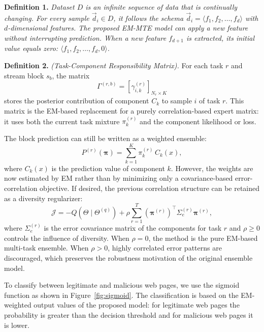 \documentclass[12pt,a4paper]{article}
\begin{document}
	\medskip
	\noindent\textbf{Definition 1.} \textit{Dataset $D$ is an infinite sequence of data that is continually changing. For every sample $\vec{d}_i \in D$, it follows the schema $\vec{d}_i = \langle f_1, f_2, \ldots, f_d \rangle$ with $d$-dimensional features. The proposed EM-MTE model can apply a new feature without interrupting prediction. When a new feature $f_{d+1}$ is extracted, its initial value equals zero: $\langle f_1, f_2, \ldots, f_d, 0 \rangle$.}
	
	\medskip
	\noindent\textbf{Definition 2.} \textit{(Task-Component Responsibility Matrix).} For each task $r$ and stream block $s_b$, the matrix
	\[
	\Gamma^{(r,b)}=
	\left[\gamma_{i,k}^{(r)}\right]_{N_r\times K}
	\]
	stores the posterior contribution of component $C_k$ to sample $i$ of task $r$. This matrix is the EM-based replacement for a purely correlation-based expert matrix: it uses both the current task mixture $\pi_k^{(r)}$ and the component likelihood or loss.
	
	The block prediction can still be written as a weighted ensemble:
	\begin{equation}
		P^{(r)}(\boldsymbol{\pi}) = \sum_{k=1}^{K} \pi_k^{(r)}\, C_k(x),
		\label{eq:pW}
	\end{equation}
	where $C_k(x)$ is the prediction value of component $k$. However, the weights are now estimated by EM rather than by minimizing only a covariance-based error-correlation objective. If desired, the previous correlation structure can be retained as a diversity regularizer:
	\begin{equation}
		\mathcal{J}
		=
		-Q(\Theta\mid\Theta^{(q)})
		+
		\rho
		\sum_{r=1}^{T}
		(\boldsymbol{\pi}^{(r)})^{\top}
		\Sigma_e^{(r)}
		\boldsymbol{\pi}^{(r)},
		\label{eq:phi}
	\end{equation}
	where $\Sigma_e^{(r)}$ is the error covariance matrix of the components for task $r$ and $\rho\geq0$ controls the influence of diversity. When $\rho=0$, the method is the pure EM-based multi-task ensemble. When $\rho>0$, highly correlated error patterns are discouraged, which preserves the robustness motivation of the original ensemble model.
	
	To classify between legitimate and malicious web pages, we use the sigmoid function as shown in Figure~\ref{fig:sigmoid}. The classification is based on the EM-weighted output values of the proposed model: for legitimate web pages the probability is greater than the decision threshold and for malicious web pages it is lower.
	
\end{document}
